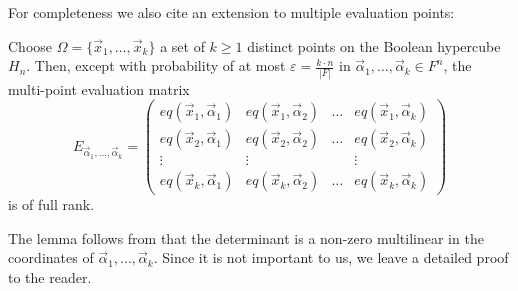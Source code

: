 For completeness we also cite an extension to multiple evaluation points:
\begin{lem}
\label{lem:multipoint:eval}
Choose $\Omega =\{\vec x_1, \ldots, \vec x_k\}$ a set of $k\geq 1$ distinct points on the Boolean hypercube $H_n$. 
Then, except with probability of at most $\varepsilon = \frac{k\cdot n}{|F|}$ in $\vec \alpha_1, \ldots, \vec \alpha_k \in F^n$, the multi-point evaluation matrix
\begin{equation*}
E_{\vec\alpha_1,\ldots,\vec\alpha_k} =
\begin{pmatrix}
eq(\vec x_1,\vec \alpha_1) & eq(\vec x_1, \vec\alpha_2) & \ldots & eq(\vec x_1, \vec\alpha_k)
\\
eq(\vec x_2,\vec \alpha_1) & eq(\vec x_2, \vec\alpha_2) & \ldots & eq(\vec x_2, \vec\alpha_k)
\\
\vdots & \vdots & &\vdots
\\
eq(\vec x_k,\vec \alpha_1) & eq(\vec x_k, \vec\alpha_2) & \ldots & eq(\vec x_k, \vec\alpha_k)
\end{pmatrix}
\end{equation*}
is of full rank.
\end{lem}

The lemma follows from that the determinant is a non-zero multilinear in the coordinates of $\vec\alpha_1, \ldots, \vec\alpha_k$.
Since it is not important to us, we leave a detailed proof to the reader.




